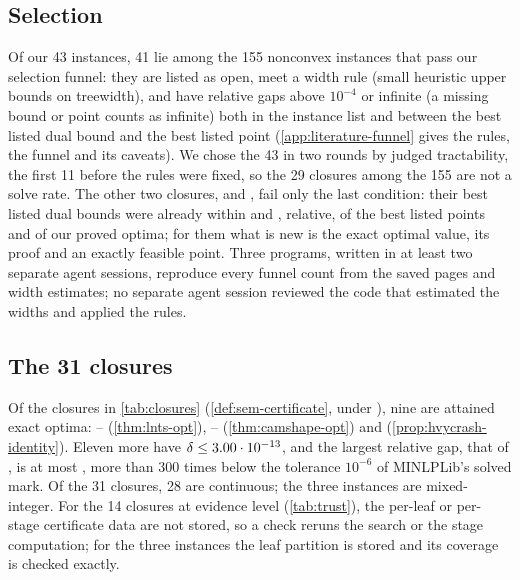 \begingroup\makeatletter{}\makeatother


\endgroup

\subsection{Selection}\label{sec:results-selection}

Of our 43 instances, 41 lie among the 155 nonconvex instances that pass our selection funnel: they are listed as open, meet a width rule (small heuristic upper bounds on treewidth), and have relative gaps above $10^{-4}$ or infinite (a missing bound or point counts as infinite) both in the instance list and between the best listed dual bound and the best listed point (\cref{app:literature-funnel} gives the rules, the funnel and its caveats).
We chose the 43 in two rounds by judged tractability, the first 11 before the rules were fixed, so the 29 closures among the 155 are not a solve rate.
The other two closures,  and , fail only the last condition: their best listed dual bounds were already within  and , relative, of the best listed points and of our proved optima; for them what is new is the exact optimal value, its proof and an exactly feasible point.
Three programs, written in at least two separate agent sessions, reproduce every funnel count from the saved pages and width estimates; no separate agent session reviewed the code that estimated the widths and applied the rules.

\subsection{The 31 closures}\label{sec:results-closed}

Of the closures in \cref{tab:closures} (\cref{def:sem-certificate}, under ), nine are attained exact optima: -- (\cref{thm:lnts-opt}), -- (\cref{thm:camshape-opt}) and  (\cref{prop:hvycrash-identity}).
Eleven more have $\delta\le3.00\cdot 10^{-13}$, and the largest relative gap, that of , is at most , more than 300 times below the tolerance $10^{-6}$ of MINLPLib's solved mark.
Of the 31 closures, 28 are continuous; the three  instances are mixed-integer.
For the 14 closures at evidence level  (\cref{tab:trust}), the per-leaf or per-stage certificate data are not stored, so a check reruns the search or the stage computation; for the three  instances the leaf partition is stored and its coverage is checked exactly.

